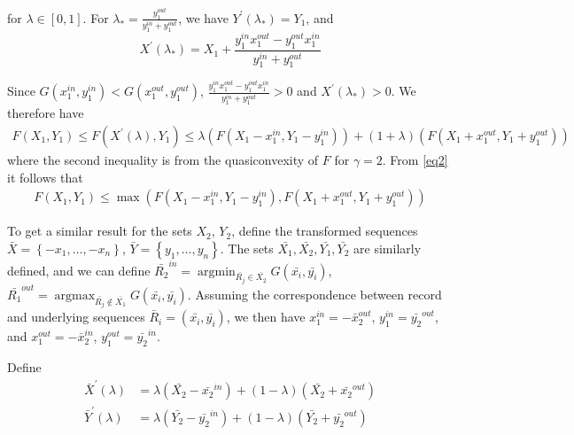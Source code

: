 \documentclass{article}
\theoremstyle{case}
\DeclareMathOperator*{\argmax}{argmax} %
\DeclareMathOperator*{\argmin}{argmin} %
\begin{document}
for $\lambda \in \left[ 0,1\right]$. For $\lambda_{*} = \frac{y_1^{out}}{y_1^{in} + y_1^{out}}$, we have $Y^\prime\left( \lambda_{*}\right) = Y_1$, and 
\[X^\prime\left( \lambda_{*}\right) = X_1 + \frac{y_1^{in}x_1^{out}-y_1^{out}x_1^{in}}{y_1^{in} + y_1^{out}}\]

Since $G(x_1^{in}, y_1^{in}) < G(x_1^{out}, y_1^{out})$, $\frac{y_1^{in}x_1^{out}-y_1^{out}x_1^{in}}{y_1^{in} + y_1^{out}} > 0$ and $X^\prime\left( \lambda_{*}\right) > 0$. We therefore have 
\begin{align} \label{eq2}
F(X_1, Y_1) \leq F(X^\prime\left( \lambda \right), Y_1) \leq \lambda\left( F(X_1-x_1^{in},Y_1-y_1^{in})\right) + \left( 1 + \lambda\right)\left( F(X_1+x_1^{out},Y_1+y_1^{out})\right)
\end{align}
where the second inequality is from the quasiconvexity of $F$ for $\gamma = 2$. From \ref{eq2} it follows that 
\begin{align} \label{eq3}
F(X_1, Y_1) \leq \max{\left(F(X_1-x_1^{in},Y_1-y_1^{in}), F(X_1+x_1^{out},Y_1+y_1^{out})\right)}
\end{align}

To get a similar result for the sets $X_2$, $Y_2$, define the transformed sequences $\bar{X} = \left\lbrace -x_1, \dots, -x_n\right\rbrace$, $\bar{Y} = \left\lbrace y_1, \dots, y_n\right\rbrace$. The sets $\bar{X_1}, \bar{X_2}, \bar{Y_1}, \bar{Y_2}$ are similarly defined, and we can define $\bar{R_2}^{in} = \argmin_{\bar{R_j} \in \bar{X_2}} G(\bar{x_i}, \bar{y_i})$, $\bar{R_1}^{out} = \argmax_{\bar{R_j} \not\in \bar{X_1}} G(\bar{x_i}, \bar{y_i})$. Assuming the correspondence between record and underlying sequences $\bar{R}_i = \left(\bar{x_i}, \bar{y_i}\right)$, we then have $x_1^{in} = -\bar{x}_2^{out}$, $y_1^{in} = \bar{y_2}^{out}$, and $x_1^{out} = -\bar{x}_2^{in}$, $y_1^{out} = \bar{y_2}^{in}$. 

Define
\begin{align*}
\bar{X}^\prime\left( \lambda \right) & = \lambda \left( \bar{X_2} - \bar{x_2}^{in}\right) + \left( 1 - \lambda\right) \left( \bar{X_2} + \bar{x_2}^{out}\right) \\
\bar{Y}^\prime\left( \lambda \right) & = \lambda \left( \bar{Y_2} - \bar{y_2}^{in}\right) + \left( 1 - \lambda\right) \left( \bar{Y_2} + \bar{y_2}^{out}\right)
\end{align*}
\end{document}
